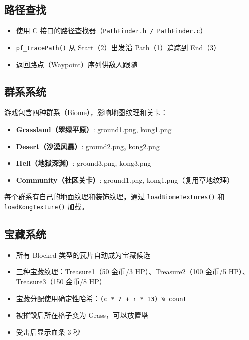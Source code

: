 \documentclass[12pt,a4paper]{ctexart}
\begin{document}
\subsection{路径查找}

\begin{itemize}
    \item 使用 C 接口的路径查找器（\texttt{PathFinder.h / PathFinder.c}）
    \item \texttt{pf\_tracePath()} 从 Start（2）出发沿 Path（1）追踪到 End（3）
    \item 返回路点（Waypoint）序列供敌人跟随
\end{itemize}

\subsection{群系系统}

游戏包含四种群系（Biome），影响地图纹理和关卡：

\begin{itemize}
    \item \textbf{Grassland（翠绿平原）}: ground1.png, kong1.png
    \item \textbf{Desert（沙漠风暴）}: ground2.png, kong2.png
    \item \textbf{Hell（地狱深渊）}: ground3.png, kong3.png
    \item \textbf{Community（社区关卡）}: ground1.png, kong1.png（复用草地纹理）
\end{itemize}

每个群系有自己的地面纹理和装饰纹理，通过 \texttt{loadBiomeTextures()} 和 \texttt{loadKongTexture()} 加载。

\subsection{宝藏系统}

\begin{itemize}
    \item 所有 Blocked 类型的瓦片自动成为宝藏候选
    \item 三种宝藏纹理：Treasure1（50 金币/3 HP）、Treasure2（100 金币/5 HP）、Treasure3（150 金币/8 HP）
    \item 宝藏分配使用确定性哈希：\texttt{(c * 7 + r * 13) \% count}
    \item 被摧毁后所在格子变为 Grass，可以放置塔
    \item 受击后显示血条 3 秒
\end{itemize}
\end{document}
